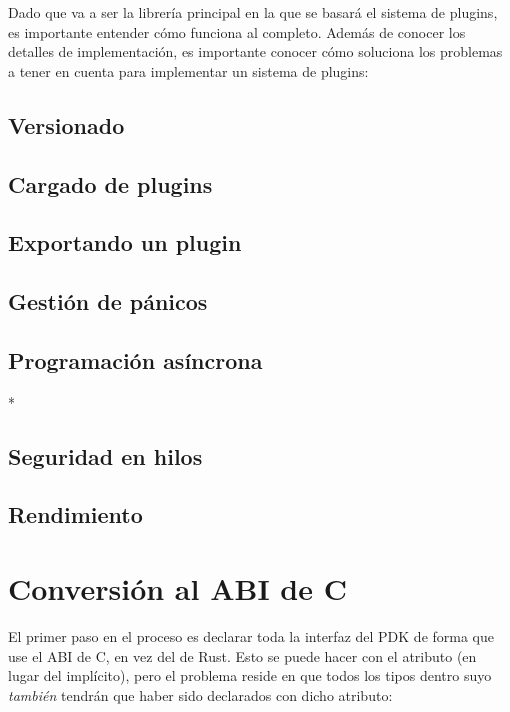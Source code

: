 Dado que  va a ser la librería principal en la que se basará el
sistema de plugins, es importante entender cómo funciona al completo. Además de
conocer los detalles de implementación, es importante conocer cómo \abistable
soluciona los problemas a tener en cuenta para implementar un sistema de
plugins:

\subsection{Versionado}

\subsection{Cargado de plugins}

\subsection{Exportando un plugin}

\subsection{Gestión de pánicos}

\subsection{Programación asíncrona}

* 

\subsection{Seguridad en hilos}

\subsection{Rendimiento}

\section{Conversión al ABI de C}

El primer paso en el proceso es declarar toda la interfaz del PDK de forma que
use el ABI de C, en vez del de Rust. Esto se puede hacer con el atributo
\code{#[repr(C)]} (en lugar del  implícito), pero el
problema reside en que todos los tipos dentro suyo \emph{también} tendrán que
haber sido declarados con dicho atributo:

